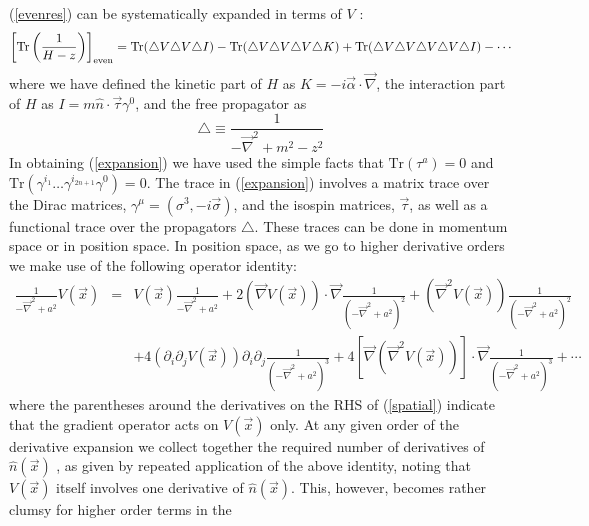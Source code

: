 \documentclass[a4paper,prd]{revtex4}
\begin{document}
(\ref{evenres}) can be systematically expanded in terms of
$V$ : 
\begin{eqnarray}
\left[\textrm{Tr}\left(\frac{1}{H-z}\right)\right]_{\rm{even}}=\textrm{Tr}(\triangle
V\triangle V\triangle I)-
\textrm{Tr}(\triangle V\triangle V\triangle V\triangle K)+\textrm{Tr}(\triangle
V\triangle V\triangle V\triangle V\triangle I)- \cdots 
\label{expansion}
\end{eqnarray}
where we have defined the kinetic part of $H$ as
$K=-i\vec{\alpha}\cdot \vec{\nabla}$, the interaction part of $H$ as 
$I=m\hat{n}\cdot
\vec{\tau}\gamma^{0}$, and the free propagator as
\begin{equation}
\triangle\equiv \frac{1}{-\vec{\nabla}^{2}+m^{2}-z^{2}}
\label{freeres}
\end{equation}
In obtaining (\ref{expansion}) we have used the simple facts
that $\textrm{Tr}(\tau^{a})=0$ and $\textrm{Tr} (\gamma^{i_1}\dots
\gamma^{i_{2n+1}}\gamma^{0})=0$. The trace in (\ref{expansion})
involves a matrix trace over the Dirac matrices, $\gamma
^{\mu}=(\sigma^{3}, -i\vec{\sigma})$, and  the isospin matrices,
$\vec{\tau}$, as well as a functional trace over the propagators
$\triangle$. These traces can be done in momentum space or in position
space. In position space, as we go to higher derivative orders we make use of the
following operator identity:
\begin{eqnarray}
\frac{1}{-\vec{\nabla}^{2}+a^{2}} V(\vec{x})&=&V(\vec{x})\frac{1}{-\vec{\nabla}^{2}+
a^{2}} +2\left(\vec{\nabla}V(\vec{x})\right)\cdot
\vec{\nabla}\frac{1}{(-\vec{\nabla}^{2}+a^{2})^{2}}+\left(\vec{\nabla}^{2}
V(\vec{x})\right)\frac{1}{(-\vec{\nabla}^{2}+a^{2})^{2}}                                                                                                    
\nonumber\\ & & + 4\left(\partial_{i} \partial_{j}  V(\vec{x})\right)\partial_{i} \partial_{j}
\frac{1}{(-\vec{\nabla}^{2}+a^{2})^{3}}+4\left[\vec{\nabla}\left(\vec{\nabla}^{2} V(\vec{x})\right)\right] \cdot
\vec{\nabla} \frac{1}{(-\vec{\nabla}^{2}+a^{2})^{3}}+\cdots
\label{spatial}
\end{eqnarray}
where the parentheses around the derivatives on the RHS of
(\ref{spatial}) indicate that the gradient operator acts on
$V(\vec{x})$ only. At any given order of the derivative expansion we
collect together the required number of derivatives of
$\hat{n}(\vec{x})$ , as given by repeated application of the above
identity, noting that
$V(\vec{x})$ itself involves one derivative of $\hat{n}(\vec{x})$.
This,  however,  becomes rather clumsy for higher order terms in the
\end{document}
